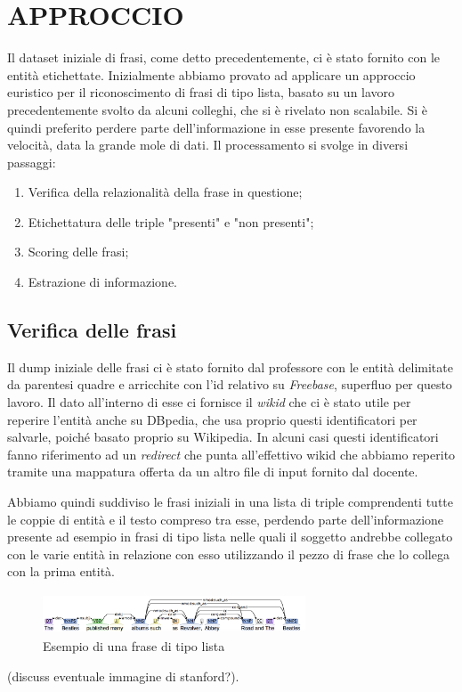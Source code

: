 \documentclass[10pt,a4paper,twocolumn]{article}
\begin{document}
\section{APPROCCIO}

Il dataset iniziale di frasi, come detto precedentemente, ci è stato fornito con le entità etichettate. Inizialmente abbiamo provato ad applicare un approccio euristico per il riconoscimento di frasi di tipo lista, basato su un lavoro precedentemente svolto da alcuni colleghi, che si è rivelato non scalabile. Si è quindi preferito perdere parte dell'informazione in esse presente favorendo la velocità, data la grande mole di dati.
Il processamento si svolge in diversi passaggi:
\begin{enumerate}
\item Verifica della relazionalità della frase in questione;
\item Etichettatura delle triple "presenti" e "non presenti";
\item Scoring delle frasi;
\item Estrazione di informazione.
\end{enumerate}

\subsection{Verifica delle frasi}
Il dump iniziale delle frasi ci è stato fornito dal professore con le entità delimitate da parentesi quadre e arricchite con l'id relativo su \textit{Freebase}, superfluo per questo lavoro. Il dato all'interno di esse ci fornisce il \textit{wikid} che ci è stato utile per reperire l'entità anche su DBpedia, che usa proprio questi identificatori per salvarle, poiché basato proprio su Wikipedia. In alcuni casi questi identificatori fanno riferimento ad un \textit{redirect} che punta all'effettivo wikid che abbiamo reperito tramite una mappatura offerta da un altro file di input fornito dal docente.

Abbiamo quindi suddiviso le frasi iniziali in una lista di triple comprendenti tutte le coppie di entità e il testo compreso tra esse, perdendo parte dell'informazione presente ad esempio in frasi di tipo lista nelle quali il soggetto andrebbe collegato con le varie entità in relazione con esso utilizzando il pezzo di frase che lo collega con la prima entità. 
\begin{figure}[h]
	\includegraphics[width=7.8cm, height=1.2cm]{stanford}
	\caption{Esempio di una frase di tipo lista}
\end{figure}
 (discuss eventuale immagine di stanford?).
\end{document}
